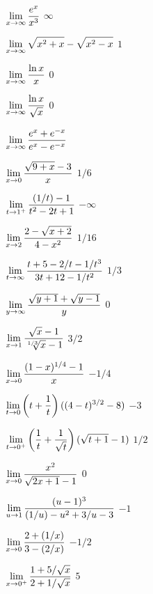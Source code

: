 \iflatetranscendentals
\elselatetranscendentals
\endexercise

\exercise $\displaystyle\lim_{x\to \infty} {e^x\over x^3}$
\answer $\infty$
\endanswer
\filatetranscendentals
\endexercise

\exercise $\displaystyle\lim_{x\to \infty} \sqrt{x^2+x}-\sqrt{x^2-x}$
\answer $1$
\endanswer

\iflatetranscendentals
\elselatetranscendentals
\endexercise

\exercise $\displaystyle\lim_{x\to \infty} {\ln x\over x}$
\answer $0$
\endanswer
\endexercise

\exercise $\displaystyle\lim_{x\to \infty} {\ln x\over \sqrt{x}}$
\answer $0$
\endanswer
\endexercise

\exercise $\displaystyle\lim_{x\to\infty} {e^x + e^{-x}\over e^x -e^{-x}}$
\endanswer
\filatetranscendentals
\endexercise

\exercise $\displaystyle\lim_{x\to0}{\sqrt{9+x}-3\over x}$
\answer $1/6$
\endanswer
\endexercise

\exercise $\displaystyle\lim_{t\to1^+}{(1/t)-1\over t^2-2t+1}$
\answer $-\infty$
\endanswer
\endexercise

\exercise $\displaystyle\lim_{x\to2}{2-\sqrt{x+2}\over 4-x^2}$
\answer $1/16$
\endanswer
\endexercise

\exercise $\displaystyle\lim_{t\to\infty}{t+5-2/t-1/t^3\over 3t+12-1/t^2}$
\answer $1/3$
\endanswer
\endexercise

\exercise $\displaystyle\lim_{y\to\infty}{\sqrt{y+1}+\sqrt{y-1}\over y}$
\answer $0$
\endanswer
\endexercise

\exercise $\ds\lim_{x\to1}{\sqrt{x}-1\over \root 1/3\of{x}-1}$
\answer $3/2$
\endanswer
\endexercise

\exercise $\displaystyle\lim_{x\to0}{(1-x)^{1/4}-1\over x}$
\answer $-1/4$
\endanswer
\endexercise

\exercise $\displaystyle\lim_{t\to 0}{\left(t+{1\over t}\right)((4-t)^{3/2}-8)}$
\answer $-3$
\endanswer
\endexercise

\exercise $\displaystyle\lim_{t\to 0^+}\left({1\over t}+{1\over\sqrt{t}}\right)
(\sqrt{t+1}-1)$
\answer $1/2$
\endanswer
\endexercise

\exercise $\displaystyle\lim_{x\to 0}{x^2\over\sqrt{2x+1}-1}$
\answer $0$
\endanswer
\endexercise

\exercise $\displaystyle\lim_{u\to 1}{(u-1)^3\over (1/u)-u^2+3/u-3}$
\answer $-1$
\endanswer
\endexercise

\exercise $\displaystyle\lim_{x\to 0}{2+(1/x)\over 3-(2/x)}$
\answer $-1/2$
\endanswer
\endexercise

\exercise $\displaystyle\lim_{x\to 0^+}{1+5/\sqrt{x}\over 2+1/\sqrt{x}}$
\answer $5$
\endanswer
\endexercise

